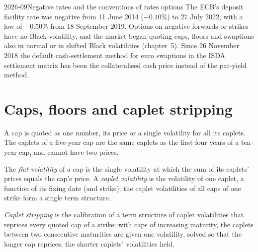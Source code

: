 \begin{dated}{2026-09}{Negative rates and the conventions of rates options}\label{dat:rc:vanilla-rates-options:negative}
The ECB's deposit facility rate was negative from 11 June 2014 ($-0.10\%$) to 27
July 2022, with a low of $-0.50\%$ from 18 September 2019. Options on negative
forwards or strikes have no Black volatility, and the market began quoting caps,
floors and swaptions also in normal or in shifted Black volatilities
(chapter~5). Since 26 November 2018 the default cash-settlement method for
euro swaptions in the ISDA settlement matrix has been the collateralised cash
price instead of the par-yield method.
\end{dated}

\section{Caps, floors and caplet stripping}

A cap is quoted as one number, its price or a single volatility for all its
caplets. The caplets of a five-year cap are the same caplets as the first four
years of a ten-year cap, and cannot have two prices.

\begin{definition}\label{def:rc:vanilla-rates-options:flat}
The \emph{flat volatility} of a cap is the single
volatility at which the sum of its caplets' prices equals the cap's price. A
\emph{caplet volatility} is the volatility of one
caplet, a function of its fixing date (and strike); the caplet volatilities of
all caps of one strike form a single term structure.
\end{definition}

\begin{definition}\label{def:rc:vanilla-rates-options:strip}
\emph{Caplet stripping} is the calibration of a term
structure of caplet volatilities that reprices every quoted cap of a strike:
with caps of increasing maturity, the caplets between two consecutive
maturities are given one volatility, solved so that the longer cap reprices,
the shorter caplets' volatilities held.
\end{definition}

\label{lst:rc:vanilla-rates-options:strip}

